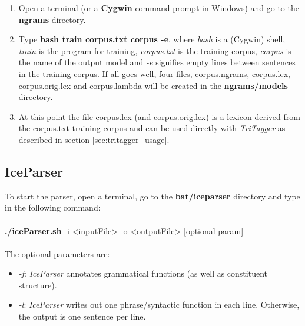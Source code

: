 \documentclass[11pt]{article}
\begin{document}
\begin{enumerate}
\item Open a terminal (or a \textbf{Cygwin} command prompt in Windows) and go to the \textbf{ngrams} directory.
\item Type {\bf bash train corpus.txt corpus -e}, where \emph{bash} is a (Cygwin) shell, \emph{train} is the program for training, \emph{corpus.txt} is the training corpus, \emph{corpus} is the name of the output model and \emph{-e} signifies empty lines between sentences in the training corpus.
If all goes well, four files, corpus.ngrams, corpus.lex, corpus.orig.lex and corpus.lambda will be created in the \textbf{ngrams/models} directory.
\item At this point the file corpus.lex (and corpus.orig.lex) is a lexicon derived from the corpus.txt training corpus and can be used directly with \emph{TriTagger} as described in section \ref{sec:tritagger_usage}.
\end{enumerate}


\subsection{IceParser}
To start the parser, open a terminal, go to the \textbf{bat/iceparser} directory and type in the following command:\\ \\
{\bf ./iceParser.sh} -i <inputFile> -o <outputFile> [optional param] \\ \\
The optional parameters are:
\begin{itemize}
\item \emph{-f}: \emph{IceParser} annotates grammatical functions (as well as constituent structure).
\item \emph{-l}: \emph{IceParser} writes out one phrase/syntactic function in each line. Otherwise, the output is one sentence per line.
\end{itemize}
\end{document}
